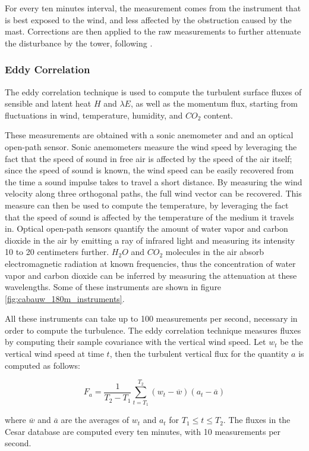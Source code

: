 \documentclass[a4paper]{book}
\begin{document}
For every ten minutes interval, the measurement comes from the instrument that is best exposed to the wind, and less affected by the obstruction caused by the mast. Corrections are then applied to the raw measurements to further attenuate the disturbance by the tower, following \cite{winddistortion}.

\subsubsection{Eddy Correlation}
\label{sec:eddy_correlation}
The eddy correlation technique is used to compute the turbulent surface fluxes of sensible and latent heat $H$ and $\lambda E$, as well as the momentum flux, starting from fluctuations in wind, temperature, humidity, and $CO_2$ content.

These measurements are obtained with a sonic anemometer and and an optical open-path sensor. Sonic anemometers measure the wind speed by leveraging the fact that the speed of sound in free air is affected by the speed of the air itself; since the speed of sound is known, the wind speed can be easily recovered from the time a sound impulse takes to travel a short distance. By measuring the wind velocity along three orthogonal paths, the full wind vector can be recovered. This measure can then be used to compute the temperature, by leveraging the fact that the speed of sound is affected by the temperature of the medium it travels in. Optical open-path sensors quantify the amount of water vapor and carbon dioxide in the air by emitting a ray of infrared light and measuring its intensity 10 to 20 centimeters further. $H_2O$ and $CO_2$ molecules in the air absorb electromagnetic radiation at known frequencies, thus the concentration of water vapor and carbon dioxide can be inferred by measuring the attenuation at these wavelengths. Some of these instruments are shown in figure \ref{fig:cabauw_180m_instruments}.

All these instruments can take up to 100 measurements per second, necessary in order to compute the turbulence. The eddy correlation technique measures fluxes by computing their sample covariance with the vertical wind speed. Let $w_t$ be the vertical wind speed at time $t$, then the turbulent vertical flux for the quantity $a$ is computed as follows:

$$
F_a=\frac{1}{T_2-T_1}\sum_{t=T_1}^{T_2}(w_t-\overline{w})(a_t-\overline{a})
$$

\noindent where $\overline{w}$ and $\overline{a}$ are the averages of $w_t$ and $a_t$ for $T_1\leq t\leq T_2$. The fluxes in the Cesar database are computed every ten minutes, with 10 measurements per second.
\end{document}
